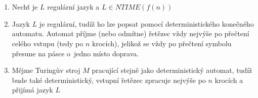 \documentclass[a4paper]{article}
\begin{document}
\section*{}
\begin{enumerate}
    \item Nechť je $L$ regulární jazyk a $L \in NTIME(f(n))$
    \item Jazyk $L$ je regulární, tudíž ho lze popsat pomocí deterministického konečného automatu. %
    Automat příjme (nebo odmítne) řetězec vždy nejvýše po přečtení celého vstupu (tedy po $n$ krocích),
    jelikož se vždy po přečtení symbolu přesune na pásce o~jedno místo doprava.
    \item Mějme Turingův stroj $M$ pracující stejně jako deterministický automat, tudíž bude také deterministický, vstupní řetězec zpracuje
    nejvýše po $n$ krocích a přijímá jazyk $L$
    \begin{comment}
    \item Tento automat pak lze simulovat pomocí deterministického Turingova stroje $M=(Q, \Sigma, \Gamma, \delta, q_0, q_f)$, kde:
    \begin{itemize}
        \item $Q=Q_{KA}\cup \{q_f\}$
        \item $\Gamma = \Sigma \cup \{\Delta\}$
        \item $\delta$ je zkonstruovaná následovně:
        \begin{itemize}
            \item $\forall q \in Q\, \forall a \in \Sigma: (q,R) = \delta(p,a) \Leftrightarrow q=\delta_{KA}(p,a)$
            \item $\forall q \in F_{KA}: (q_f,\Delta) = \delta(q,\Delta)$
        \end{itemize}
        \item $q_0 = q_{0_{KA}}$
        \item $q_f \in Q \wedge q_f \notin Q_{KA}$
    \end{itemize}
    \item Počáteční konfigurace $M$ je $(q_0,\underline{a_1} a_2 a_3\ldots a_n\Delta^{\omega})$, kde $a_1a_2a_3\ldots a_n \in \Sigma^*$
    \item Časová složitost stroje $M$ je funkce $T_M(n)=n+1$, a tedy stroj libovolný vstup zpracuje nanejvýš po $n+1$ krocích.
    Z~jeho definice je zřejmé, že musí projít přes první symbol řetězce $w$ až po jeho poslední symbol a poté teprve
    přejde do koncového stavu.
    V~každém kroku, kdy má pod hlavou symbol z~$\Sigma$ udělá pohyb hlavou doprava nebo se zasekne a tím řetězec odmítne.
    Takovýchto kroků udělá nanejvýše $n$, kde $|\omega| = n$.
    Pokud je pod hlavou symbol $\Delta$ může buď přejít do koncového stavu nebo se zaseknout, a tak řetězec odmítnout.
    Tento krok může být učiněn maximálně jeden.
    Dohromady tedy může provést nejvýše $n+1$ kroků.
    \end{comment}


\end{enumerate}
\end{document}
